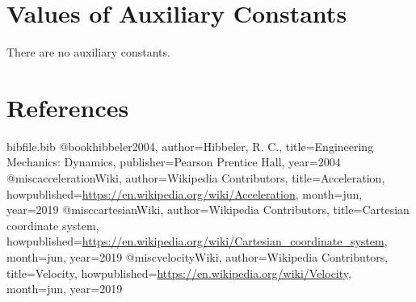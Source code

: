 \documentclass[12pt]{article}
\begin{document}
\section{Values of Auxiliary Constants}
\label{Sec:AuxConstants}
There are no auxiliary constants.

\section{References}
\label{Sec:References}
\begin{filecontents*}{bibfile.bib}
@book{hibbeler2004,
author={Hibbeler, R. C.},
title={Engineering Mechanics: Dynamics},
publisher={Pearson Prentice Hall},
year={2004}}
@misc{accelerationWiki,
author={Wikipedia Contributors},
title={Acceleration},
howpublished={\url{https://en.wikipedia.org/wiki/Acceleration}},
month=jun,
year={2019}}
@misc{cartesianWiki,
author={Wikipedia Contributors},
title={Cartesian coordinate system},
howpublished={\url{https://en.wikipedia.org/wiki/Cartesian\_coordinate\_system}},
month=jun,
year={2019}}
@misc{velocityWiki,
author={Wikipedia Contributors},
title={Velocity},
howpublished={\url{https://en.wikipedia.org/wiki/Velocity}},
month=jun,
year={2019}}
\end{filecontents*}
\nocite{*}
\printbibliography[heading=none]
\end{document}
